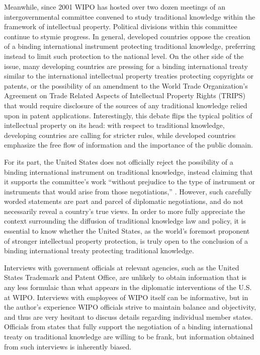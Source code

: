 \documentclass[12pt]{article}
\begin{document}
Meanwhile, since 2001 WIPO has hosted over two dozen meetings of an intergovernmental committee 
convened to study traditional knowledge within the framework of intellectual property. Political 
divisions within this committee continue to stymie progress. In general, developed countries 
oppose the creation of a binding international instrument protecting traditional knowledge, preferring 
instead to limit such protection to the national level. On the other side of the issue, many 
developing countries are pressing for a binding international treaty similar to the international 
intellectual property treaties protecting copyrights or patents, or the possibility of an amendment 
to the World Trade Organization's Agreement on Trade Related Aspects of Intellectual Property Rights 
(TRIPS) that would require disclosure of the sources of any traditional knowledge relied upon 
in patent applications. Interestingly, this debate flips the typical politics 
of intellectual property on its head: with respect to traditional knowledge, developing countries are 
calling for stricter rules, while developed countries emphasize the free flow of information and the 
importance of the public domain.

For its part, the United States does not officially reject the possibility of a binding international 
instrument on traditional knowledge, instead claiming that it supports the committee's work ``without 
prejudice to the type of instrument or instruments that would arise from those 
negotiations,'' \citep{world_intellectual_property_organization2013intergovernmental}.
However, such carefully worded statements are part and parcel of diplomatic negotiations, and 
do not necessarily reveal a country's true views.
In order to more fully appreciate the context surrounding the diffusion of traditional knowledge law 
and policy, it is essential to know whether the United States, as the world's foremost 
proponent of stronger intellectual property protection, is truly open to the conclusion of a binding international treaty protecting traditional knowledge.

Interviews with government officials at relevant agencies, such as the United States Trademark and 
Patent Office, are unlikely to obtain information that is any less formulaic than what 
appears in the diplomatic interventions of the U.S. at WIPO. Interviews with employees of WIPO itself 
can be informative, but in the author's experience WIPO officials strive to maintain balance and objectivity, 
and thus are very 
hesitant to discuss details regarding individual member states. Officials from states that fully 
support the negotiation of a binding international treaty on traditional knowledge are willing to be 
frank, but information obtained from such interviews is inherently biased.
\end{document}
